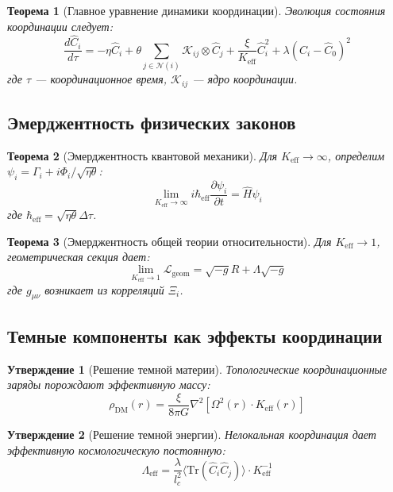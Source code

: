 \documentclass[11pt,a4paper]{article}
\newtheorem{theorem}{Теорема}
\newtheorem{proposition}{Утверждение}
\begin{document}
	\begin{theorem}[Главное уравнение динамики координации]
		Эволюция состояния координации следует:
		\[
		\frac{d\hat{C}_i}{d\tau} = -\eta \hat{C}_i + \theta \sum_{j \in \mathcal{N}(i)} \mathcal{K}_{ij} \otimes \hat{C}_j + \frac{\xi}{K_{\mathrm{eff}}} \hat{C}_i^2 + \lambda (\hat{C}_i - \hat{C}_0)^2
		\]
		где $\tau$ — координационное время, $\mathcal{K}_{ij}$ — ядро координации.
	\end{theorem}
	
	\subsection{Эмерджентность физических законов}
	
	\begin{theorem}[Эмерджентность квантовой механики]
		Для $K_{\mathrm{eff}} \to \infty$, определим $\psi_i = \Gamma_i + i\Phi_i/\sqrt{\eta\theta}$:
		\[
		\lim_{K_{\mathrm{eff}} \to \infty} i\hbar_{\mathrm{eff}}\frac{\partial\psi_i}{\partial t} = \hat{H}\psi_i
		\]
		где $\hbar_{\mathrm{eff}} = \sqrt{\eta\theta}\Delta\tau$.
	\end{theorem}
	
	\begin{theorem}[Эмерджентность общей теории относительности]  
		Для $K_{\mathrm{eff}} \to 1$, геометрическая секция дает:
		\[
		\lim_{K_{\mathrm{eff}} \to 1} \mathcal{L}_{\mathrm{geom}} = \sqrt{-g}R + \Lambda\sqrt{-g}
		\]
		где $g_{\mu\nu}$ возникает из корреляций $\Xi_i$.
	\end{theorem}
	
	\subsection{Темные компоненты как эффекты координации}
	
	\begin{proposition}[Решение темной материи]
		Топологические координационные заряды порождают эффективную массу:
		\[
		\rho_{\mathrm{DM}}(r) = \frac{\xi}{8\pi G} \nabla^2 \left[ \Omega^2(r) \cdot K_{\mathrm{eff}}(r) \right]
		\]
	\end{proposition}
	
	\begin{proposition}[Решение темной энергии]
		Нелокальная координация дает эффективную космологическую постоянную:
		\[
		\Lambda_{\mathrm{eff}} = \frac{\lambda}{l_c^2} \langle \mathrm{Tr}(\hat{C}_i\hat{C}_j) \rangle \cdot K_{\mathrm{eff}}^{-1}
		\]
	\end{proposition}
	
\end{document}
